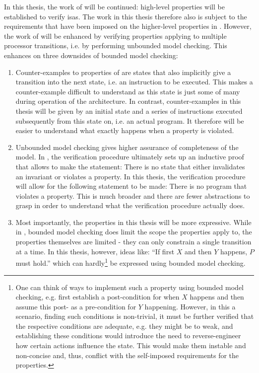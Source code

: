 In this thesis, the work of \cite{Reid17} will be continued: high-level properties will be established to verify \glspl{isa}.
The work in this thesis therefore also is subject to the requirements that have been imposed on the higher-level properties in \cite{Reid17}.
However, the work of \cite{Reid17} will be enhanced by verifying properties applying to multiple processor transitions, i.e. by performing unbounded model checking.
This enhances on three downsides of bounded model checking:
\begin{enumerate}
    \item Counter-examples to properties of \cite{Reid17} are states that also implicitly give a transition into the next state, i.e. an instruction to be executed.
    This makes a counter-example difficult to understand as this state is just some of many during operation of the architecture.
    In contrast, counter-examples in this thesis will be given by an initial state and a series of instructions executed subsequently from this state on, i.e. an actual program.
    It therefore will be easier to understand what exactly happens when a property is violated.
    \item Unbounded model checking gives higher assurance of completeness of the model.
    In \cite{Reid17}, the verification procedure ultimately sets up an inductive proof that allows to make the statement: There is no state that either invalidates an invariant or violates a property.
    In this thesis, the verification procedure will allow for the following statement to be made: There is no program that violates a property.
    This is much broader and there are fewer abstractions to grasp in order to understand what the verification procedure actually does.
    \item Most importantly, the properties in this thesis will be more expressive.
    While in \cite{Reid17}, bounded model checking does limit the scope the properties apply to, the properties themselves are limited - they can only constrain a single transition at a time.
    In this thesis, however, ideas like: \enquote{If first $ X $ and then $ Y $ happens, $ P $ must hold.} which can hardly\footnote{%
        One can think of ways to implement such a property using bounded model checking, e.g. first establish a post-condition for when $ X $ happens and then assume this post- as a pre-condition for $ Y $ happening.
        However, in this a scenario, finding such conditions is non-trivial, it must be further verified that the respective conditions are adequate, e.g. they might be to weak, and establishing these conditions would introduce the need to reverse-engineer how certain actions influence the state.
        This would make them instable and non-concise and, thus, conflict with the self-imposed requirements for the properties.
    } be expressed using bounded model checking.
\end{enumerate}

